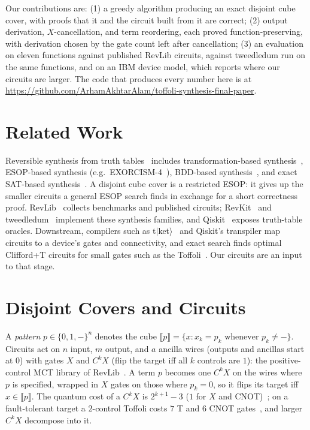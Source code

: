 \documentclass[conference]{IEEEtran}
\theoremstyle{plain}
\begin{document}
Our contributions are: (1) a greedy algorithm producing an exact
disjoint cube cover, with proofs that it and the circuit built from it
are correct; (2) output derivation, $X$-cancellation, and term
reordering, each proved function-preserving, with derivation chosen by
the gate count left after cancellation; (3) an evaluation on eleven
functions against published RevLib circuits, against tweedledum run on
the same functions, and on an IBM device model, which reports where our
circuits are larger. The code that produces every number here is at
\url{https://github.com/ArhamAkhtarAlam/toffoli-synthesis-final-paper}.

\section{Related Work}
Reversible synthesis from truth tables~\cite{saeedi2013} includes
transformation-based synthesis~\cite{miller2003}, ESOP-based synthesis
(e.g.\ EXORCISM-4~\cite{mishchenko2001}), BDD-based
synthesis~\cite{wille2009bdd}, and exact SAT-based
synthesis~\cite{grosse2008}. A disjoint cube cover is a restricted ESOP:
it gives up the smaller circuits a general ESOP search finds in exchange
for a short correctness proof. RevLib~\cite{revlib2008} collects
benchmarks and published circuits; RevKit~\cite{soeken2012revkit} and
tweedledum~\cite{schmitt2022} implement these synthesis families, and
Qiskit~\cite{qiskit2024} exposes truth-table oracles. Downstream,
compilers such as t$|$ket$\rangle$~\cite{sivarajah2020} and Qiskit's
transpiler map circuits to a device's gates and connectivity, and exact
search finds optimal Clifford+T circuits for small gates such as the
Toffoli~\cite{amy2013}. Our circuits are an input to that stage.

\section{Disjoint Covers and Circuits}
A \emph{pattern} $p\in\{0,1,-\}^n$ denotes the cube $\llbracket
p\rrbracket=\{x : x_k=p_k \text{ whenever } p_k\neq -\}$. Circuits act
on $n$ input, $m$ output, and $a$ ancilla wires (outputs and ancillas
start at $0$) with gates $X$ and $C^kX$ (flip the target iff all $k$
controls are $1$): the positive-control MCT library of
RevLib~\cite{revlib2008}. A term $p$ becomes one $C^kX$ on the wires
where $p$ is specified, wrapped in $X$ gates on those where $p_k=0$, so
it flips its target iff $x\in\llbracket p\rrbracket$. The quantum cost
of a $C^kX$ is $2^{k+1}-3$ ($1$ for $X$ and CNOT)~\cite{barenco1995,revlib2008};
on a fault-tolerant target a $2$-control Toffoli costs $7$ T and $6$ CNOT
gates~\cite{nielsen2000}, and larger $C^kX$ decompose into it.
\end{document}
